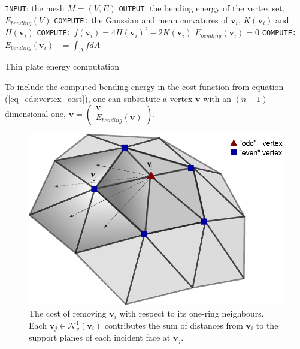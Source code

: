 \documentclass[graybox]{svmult}
\begin{document}
	\begin{algorithm}[t]
		\begin{algorithmic}
			\STATE \texttt{INPUT}: the mesh $M=(V,E)$
			\STATE \texttt{OUTPUT}: the bending energy of the vertex set, $E_{bending}(V)$
			\STATE \texttt{COMPUTE:} the Gaussian and mean curvatures of $\mathbf{v}_i$,
			$K(\mathbf{{v}}_i)$ and $H(\mathbf{{v}}_i)$
			\STATE \texttt{COMPUTE:} $f(\mathbf{v}_i) = 4H(\mathbf{{v}}_i)^2 - 2K(\mathbf{{v}}_i)$ 
			\ENDFOR
			\STATE $E_{bending}(\mathbf{{v}}_i) = 0$
			\STATE \texttt{COMPUTE:} $E_{bending}(\mathbf{v}_i) += \int_{\Delta }{f}dA$
			\ENDFOR
			\ENDFOR
		\end{algorithmic}
		\caption{Thin plate energy computation}
		\label{alg_cds:thin_plate_energy}
	\end{algorithm}
	To include the computed bending energy in the cost function from equation (\ref{eq_cds:vertex_cost}), one can substitute a vertex $\mathbf{v}$ with an $(n+1)$-dimensional one, $\mathbf{\bar{v}}=\begin{pmatrix}\mathbf{v} \\ E_{bending}(\mathbf{v})\end{pmatrix}$.
	
	\begin{figure}[t]
		\centering
		\includegraphics[width=.8\linewidth]{one-RingCost.pdf}
		\caption{\label{fig_cds:oneRingCost}
			The cost of removing $\mathbf{v}_i$ with respect to its one-ring neighbours. Each $\mathbf{v}_j \in \mathcal{N}_v^1(\mathbf{v}_i)$ contributes
			the sum of distances from $\mathbf{v}_i$ to the support planes of each incident face at $\mathbf{v}_j$.}
	\end{figure}
	
\end{document}
